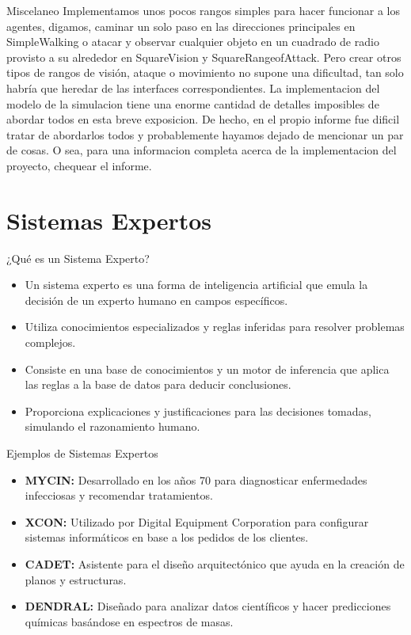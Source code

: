 \documentclass{beamer}
\begin{document}
\begin{frame}{Miscelaneo}
  Implementamos unos pocos rangos simples para hacer funcionar a los agentes, digamos, caminar un solo paso en las direcciones principales en SimpleWalking o atacar y observar cualquier objeto en un cuadrado de radio provisto a su alrededor en SquareVision y SquareRange\textunderscore of\textunderscore Attack. Pero crear otros tipos de rangos de visión, ataque o movimiento no supone una dificultad, tan solo habría que heredar de las interfaces correspondientes.
  La implementacion del modelo de la simulacion tiene una enorme cantidad de detalles imposibles de abordar todos en esta breve exposicion. De hecho, en el propio informe fue dificil tratar de abordarlos todos y probablemente hayamos dejado de mencionar un par de cosas. O sea, para una informacion completa acerca de la implementacion del proyecto, chequear el informe.
\end{frame}
\section{Sistemas Expertos}
\begin{frame}{¿Qué es un Sistema Experto?}
  \begin{itemize}
    \item Un sistema experto es una forma de inteligencia artificial que emula la decisión de un experto humano en campos específicos.
    \item Utiliza conocimientos especializados y reglas inferidas para resolver problemas complejos.
    \item Consiste en una base de conocimientos y un motor de inferencia que aplica las reglas a la base de datos para deducir conclusiones.
    \item Proporciona explicaciones y justificaciones para las decisiones tomadas, simulando el razonamiento humano.
  \end{itemize}
\end{frame}

\begin{frame}{Ejemplos de Sistemas Expertos}
  \begin{itemize}
    \item \textbf{MYCIN:} Desarrollado en los años 70 para diagnosticar enfermedades infecciosas y recomendar tratamientos.
    \item \textbf{XCON:} Utilizado por Digital Equipment Corporation para configurar sistemas informáticos en base a los pedidos de los clientes.
    \item \textbf{CADET:} Asistente para el diseño arquitectónico que ayuda en la creación de planos y estructuras.
    \item \textbf{DENDRAL:} Diseñado para analizar datos científicos y hacer predicciones químicas basándose en espectros de masas.
  \end{itemize}
\end{frame}
\end{document}
